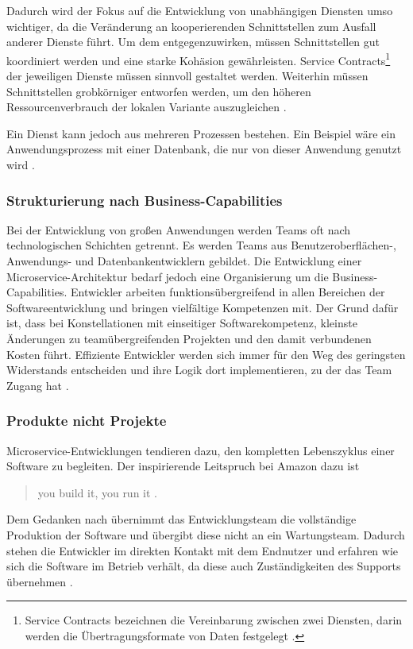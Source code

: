 Dadurch wird der Fokus auf die Entwicklung von unabhängigen Diensten umso wichtiger, da die Veränderung an kooperierenden Schnittstellen zum Ausfall anderer Dienste führt. 
Um dem entgegenzuwirken, müssen Schnittstellen gut koordiniert werden und eine starke Kohäsion gewährleisten. Service Contracts\footnote{Service Contracts bezeichnen die Vereinbarung zwischen zwei Diensten, darin werden die Übertragungsformate von Daten festgelegt \cite{microservicesvssoa}.} der jeweiligen Dienste müssen sinnvoll gestaltet werden. 
Weiterhin müssen Schnittstellen grobkörniger entworfen werden, um den höheren Ressourcenverbrauch der lokalen Variante auszugleichen \cite{FowlerMicroservice, BuildingMicroservicesNewman}. 

Ein Dienst kann jedoch aus mehreren Prozessen bestehen. Ein Beispiel wäre ein Anwendungsprozess mit einer Datenbank, die nur von dieser Anwendung genutzt wird \cite{FowlerMicroservice, BuildingMicroservicesNewman}.

\subsubsection{Strukturierung nach Business-Capabilities}
Bei der Entwicklung von großen Anwendungen werden Teams oft nach technologischen Schichten getrennt. 
Es werden Teams aus Benutzeroberflächen-, Anwendungs- und Datenbankentwicklern gebildet. 
Die Entwicklung einer Microservice-Architektur bedarf jedoch eine Organisierung um die Business-Capabilities. 
Entwickler arbeiten funktionsübergreifend in allen Bereichen der Softwareentwicklung und bringen vielfältige Kompetenzen mit.
Der Grund dafür ist, dass bei Konstellationen mit einseitiger Softwarekompetenz, kleinste Änderungen zu teamübergreifenden Projekten und den damit verbundenen Kosten führt.
Effiziente Entwickler werden sich immer für den Weg des geringsten Widerstands entscheiden und ihre Logik dort implementieren, zu der das Team Zugang hat \cite{FowlerMicroservice}.

\subsubsection{Produkte nicht Projekte}
Microservice-Entwicklungen tendieren dazu, den kompletten Lebenszyklus einer Software zu begleiten. 
Der inspirierende Leitspruch bei Amazon dazu ist \begin{quote}
  \glqq  you build it, you run it \grqq{} \cite{amazon}.\end{quote} 
Dem Gedanken nach übernimmt das Entwicklungsteam die vollständige Produktion der Software und übergibt diese nicht an ein Wartungsteam. 
Dadurch stehen die Entwickler im direkten Kontakt mit dem Endnutzer und erfahren wie sich die Software im Betrieb verhält, da diese auch Zuständigkeiten des Supports übernehmen \cite{FowlerMicroservice}.

